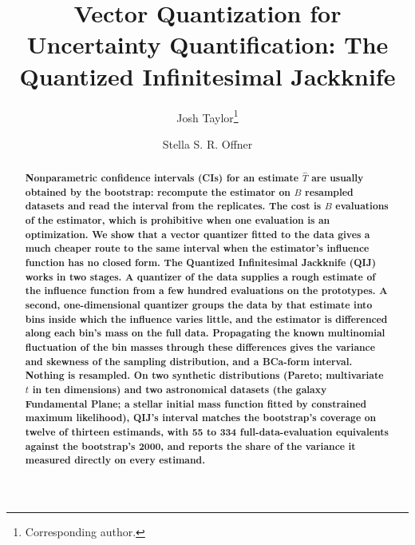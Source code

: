 \documentclass[runningheads]{llncs}
\newif\ifrev \revtrue
\newcommand{\rev}[1]{\ifrev{\color{blue}\bfseries #1}\else#1\fi}
\begin{document}
\title{Vector Quantization for Uncertainty Quantification: The Quantized Infinitesimal Jackknife}

\author{Josh Taylor\thanks{Corresponding author.} \and
Stella S. R. Offner}

\maketitle

\begin{abstract}
\rev{Nonparametric confidence intervals (CIs) for an estimate $\hat T$ are usually obtained by the bootstrap: recompute the estimator on $B$ resampled datasets and read the interval from the replicates. The cost is $B$ evaluations of the estimator, which is prohibitive when one evaluation is an optimization. We show that a vector quantizer fitted to the data gives a much cheaper route to the same interval when the estimator's influence function has no closed form. The Quantized Infinitesimal Jackknife (QIJ) works in two stages. A quantizer of the data supplies a rough estimate of the influence function from a few hundred evaluations on the prototypes. A second, one-dimensional quantizer groups the data by that estimate into bins inside which the influence varies little, and the estimator is differenced along each bin's mass on the full data. Propagating the known multinomial fluctuation of the bin masses through these differences gives the variance and skewness of the sampling distribution, and a BCa-form interval. Nothing is resampled. On two synthetic distributions (Pareto; multivariate $t$ in ten dimensions) and two astronomical datasets (the galaxy Fundamental Plane; a stellar initial mass function fitted by constrained maximum likelihood), QIJ's interval matches the bootstrap's coverage on twelve of thirteen estimands, with 55 to 334 full-data-evaluation equivalents against the bootstrap's 2000, and reports the share of the variance it measured directly on every estimand.}
\end{abstract}
\end{document}
